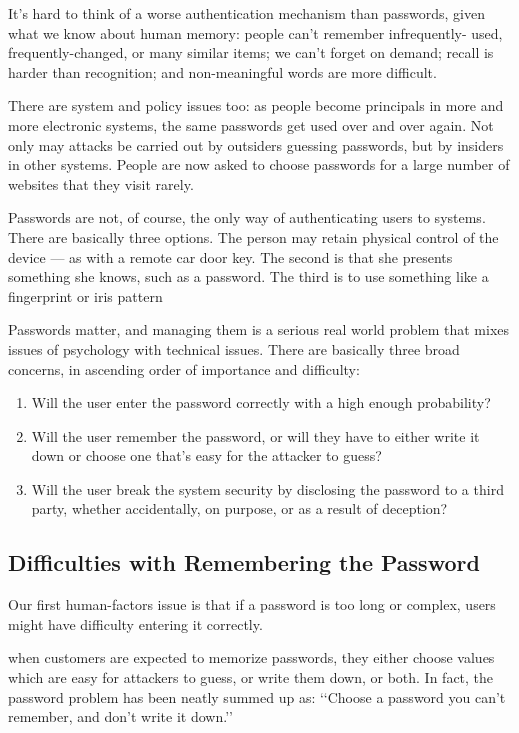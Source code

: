 	It’s hard to think of a worse authentication mechanism than passwords, given
	what we know about human memory: people can’t remember infrequently-
	used, frequently-changed, or many similar items; we can’t forget on demand;
	recall is harder than recognition; and non-meaningful words are more difficult.

	There are system and policy issues too: as people become principals in more
	and more electronic systems, the same passwords get used over and over
	again. Not only may attacks be carried out by outsiders guessing passwords,
	but by insiders in other systems. People are now asked to choose passwords
	for a large number of websites that they visit rarely.

	Passwords are not, of course, the only way of authenticating users to
	systems. There are basically three options. The person may retain physical
	control of the device — as with a remote car door key. The second is that
	she presents something she knows, such as a password. The third is to use
	something like a fingerprint or iris pattern
	
	Passwords matter, and managing them is a serious real world problem
	that mixes issues of psychology with technical issues. There are basically three
	broad concerns, in ascending order of importance and difficulty:
	
		\begin{enumerate}
			\item Will the user enter the password correctly with a high enough
			probability?
			\item Will the user remember the password, or will they have to either write it
			down or choose one that’s easy for the attacker to guess?
			\item Will the user break the system security by disclosing the password
			to a third party, whether accidentally, on purpose, or as a result of
			deception?
		\end{enumerate}


\clearpage
\subsection{Difficulties with Remembering the Password}

	Our first human-factors issue is that if a password is too long or complex,
	users might have difficulty entering it correctly.

	when customers are expected to memorize passwords, they either choose values which are easy for
	attackers to guess, or write them down, or both. In fact, the password problem
	has been neatly summed up as: ‘‘Choose a password you can’t remember, and
	don’t write it down.’’

